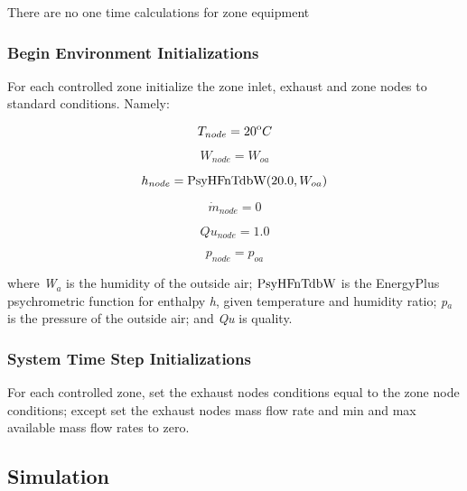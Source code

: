 There are no one time calculations for zone equipment

\subsubsection{Begin Environment Initializations}\label{begin-environment-initializations-000}

For each controlled zone initialize the zone inlet, exhaust and zone nodes to standard conditions. Namely:

\begin{equation}
{T_{node}} = {20^{\rm{o}}}C
\end{equation}

\begin{equation}
{W_{node}} = {W_{oa}}
\end{equation}

\begin{equation}
{h_{node}} = {\mathop{\rm PsyHFnTdbW}\nolimits} {\rm{(}}20.0,{W_{oa}}{\rm{)}}
\end{equation}

\begin{equation}
{\dot m_{node}} = 0
\end{equation}

\begin{equation}
Q{u_{node}} = 1.0
\end{equation}

\begin{equation}
{p_{node}} = {p_{oa}}
\end{equation}

where \emph{W\(_{a}\)} is the humidity of the outside air; \({\rm{PsyHFnTdbW}}\) is the EnergyPlus psychrometric function for enthalpy \emph{h}, given temperature and humidity ratio; \emph{p\(_{a}\)} is the pressure of the outside air; and \emph{Qu} is quality.

\subsubsection{System Time Step Initializations}\label{system-time-step-initializations-000}

For each controlled zone, set the exhaust nodes conditions equal to the zone node conditions; except set the exhaust nodes mass flow rate and min and max available mass flow rates to zero.

\subsection{Simulation}\label{simulation-003}

